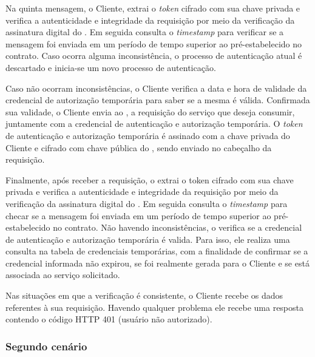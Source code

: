 Na quinta mensagem, o Cliente, extrai o \emph{token} cifrado com sua chave privada e verifica a autenticidade e integridade da requisição por meio da verificação da assinatura digital do \servidorAA. Em seguida consulta
o \emph{timestamp} para verificar se a mensagem foi enviada em um período de tempo superior ao pré-estabelecido no contrato. Caso ocorra alguma inconsistência, o processo de autenticação atual é descartado e inicia-se um novo processo de autenticação.

Caso não ocorram inconsistências, o Cliente verifica a data e hora de validade da credencial de autorização temporária para saber se a mesma é válida. Confirmada sua validade, o Cliente envia ao \servidorRest, a requisição do serviço que deseja consumir, juntamente com a credencial de autenticação e autorização temporária. O \emph{token} de autenticação e autorização temporária é assinado com a chave privada do Cliente e cifrado com chave pública do \servidorRest, sendo enviado no cabeçalho da requisição.

Finalmente, após receber a requisição, o \servidorRest{} extrai o token cifrado com sua chave privada e verifica a autenticidade e integridade da requisição por meio da verificação da assinatura digital do \servidorAA. Em seguida consulta o \emph{timestamp} para checar se a mensagem foi enviada em um período de tempo superior ao pré-estabelecido no contrato. Não havendo inconsistências, o \servidorRest{}verifica se a credencial de autenticação e autorização temporária é valida. Para isso, ele realiza uma consulta na tabela de credenciais temporárias, com a finalidade de confirmar se a credencial informada não expirou, se  foi realmente gerada para o Cliente e se está associada ao serviço solicitado.

Nas situações em que a verificação é consistente, o Cliente recebe os dados referentes à sua requisição.
Havendo qualquer problema ele recebe uma resposta contendo o código HTTP 401 (usuário não autorizado).


\subsubsection{Segundo cenário}

